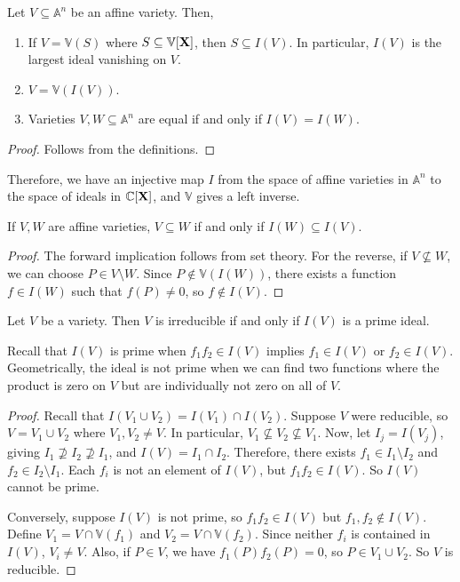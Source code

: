\begin{proposition}
    Let \( V \subseteq \mathbb A^n \) be an affine variety.
    Then,
    \begin{enumerate}
        \item If \( V = \mathbb V(S) \) where \( S \subseteq \mathbb V[\vb X] \), then \( S \subseteq I(V) \).
        In particular, \( I(V) \) is the largest ideal vanishing on \( V \).
        \item \( V = \mathbb V(I(V)) \).
        \item Varieties \( V, W \subseteq \mathbb A^n \) are equal if and only if \( I(V) = I(W) \).
    \end{enumerate}
\end{proposition}
\begin{proof}
    Follows from the definitions.
\end{proof}
Therefore, we have an injective map \( I \) from the space of affine varieties in \( \mathbb A^n \) to the space of ideals in \( \mathbb C[\vb X] \), and \( \mathbb V \) gives a left inverse.
\begin{proposition}
    If \( V, W \) are affine varieties, \( V \subseteq W \) if and only if \( I(W) \subseteq I(V) \).
\end{proposition}
\begin{proof}
    The forward implication follows from set theory.
    For the reverse, if \( V \not\subseteq W \), we can choose \( P \in V \setminus W \).
    Since \( P \not\in \mathbb V(I(W)) \), there exists a function \( f \in I(W) \) such that \( f(P) \neq 0 \), so \( f \not\in I(V) \).
\end{proof}
\begin{proposition}
    Let \( V \) be a variety.
    Then \( V \) is irreducible if and only if \( I(V) \) is a prime ideal.
\end{proposition}
Recall that \( I(V) \) is prime when \( f_1 f_2 \in I(V) \) implies \( f_1 \in I(V) \) or \( f_2 \in I(V) \).
Geometrically, the ideal is not prime when we can find two functions where the product is zero on \( V \) but are individually not zero on all of \( V \).
\begin{proof}
    Recall that \( I(V_1 \cup V_2) = I(V_1) \cap I(V_2) \).
    Suppose \( V \) were reducible, so \( V = V_1 \cup V_2 \) where \( V_1, V_2 \neq V \).
    In particular, \( V_1 \not\subseteq V_2 \not\subseteq V_1 \).
    Now, let \( I_j = I(V_j) \), giving \( I_1 \not\supseteq I_2 \not\supseteq I_1 \), and \( I(V) = I_1 \cap I_2 \).
    Therefore, there exists \( f_1 \in I_1 \setminus I_2 \) and \( f_2 \in I_2 \setminus I_1 \).
    Each \( f_i \) is not an element of \( I(V) \), but \( f_1 f_2 \in I(V) \).
    So \( I(V) \) cannot be prime.

    Conversely, suppose \( I(V) \) is not prime, so \( f_1 f_2 \in I(V) \) but \( f_1, f_2 \not\in I(V) \).
    Define \( V_1 = V \cap \mathbb V(f_1) \) and \( V_2 = V \cap \mathbb V(f_2) \).
    Since neither \( f_i \) is contained in \( I(V) \), \( V_i \neq V \).
    Also, if \( P \in V \), we have \( f_1(P) f_2(P) = 0 \), so \( P \in V_1 \cup V_2 \).
    So \( V \) is reducible.
\end{proof}
